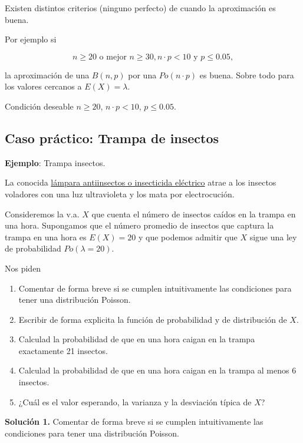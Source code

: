 \documentclass[
  letterpaper,
  DIV=11,
  numbers=noendperiod]{scrreprt}
\providecommand{\tightlist}{%
  \setlength{\itemsep}{0pt}\setlength{\parskip}{0pt}}\usepackage{longtable,booktabs,array}
\begin{document}
Existen distintos criterios (ninguno perfecto) de cuando la aproximación
es buena.

Por ejemplo si

\[n\geq 20\mbox{ o mejor }n\geq 30, n\cdot p < 10 \mbox{ y } p\leq 0.05,\]

la aproximación de una \(B(n,p)\) por una \(Po(n\cdot p)\) es buena.
Sobre todo para los valores cercanos a \(E(X)=\lambda\).

Condición deseable \(n\geq 20\), \(n\cdot p < 10\), \(p\leq 0.05\).

\subsection{Caso práctico: Trampa de
insectos}\label{caso-pruxe1ctico-trampa-de-insectos}

\textbf{Ejemplo}: Trampa insectos.

La conocida
\href{https://es.wikipedia.org/wiki/Insecticida_el\%C3\%A9ctrico}{lámpara
antiinsectos o insecticida eléctrico} atrae a los insectos voladores con
una luz ultravioleta y los mata por electrocución.

Consideremos la v.a. \(X\) que cuenta el número de insectos caídos en la
trampa en una hora. Supongamos que el número promedio de insectos que
captura la trampa en una hora es \(E(X)=20\) y que podemos admitir que
\(X\) sigue una ley de probabilidad \(Po(\lambda=20)\).

Nos piden

\begin{enumerate}
\def\labelenumi{\arabic{enumi}.}
\tightlist
\item
  Comentar de forma breve si se cumplen intuitivamente las condiciones
  para tener una distribución Poisson.
\item
  Escribir de forma explicita la función de probabilidad y de
  distribución de \(X\).
\item
  Calculad la probabilidad de que en una hora caigan en la trampa
  exactamente 21 insectos.
\item
  Calculad la probabilidad de que en una hora caigan en la trampa al
  menos 6 insectos.
\item
  ¿Cuál es el valor esperando, la varianza y la desviación típica de
  \(X\)?
\end{enumerate}

\textbf{Solución 1.} Comentar de forma breve si se cumplen
intuitivamente las condiciones para tener una distribución Poisson.
\end{document}
